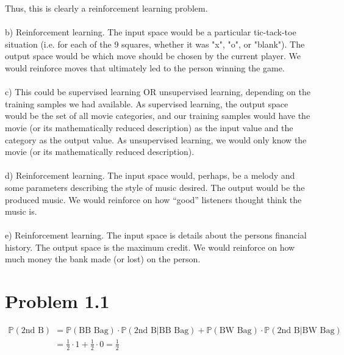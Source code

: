 \documentclass[11pt,letterpaper]{article}
\newcommand{\p}[0]{\mathbb{P}}
\begin{document}
Thus, this is clearly a reinforcement learning problem.
\\\\
b) Reinforcement learning.  The input space would be a particular tic-tack-toe situation (i.e. for each of the 9 squares, whether it was "x", "o", or "blank").  The output space would be which move should be chosen by the current player.  We would reinforce moves that ultimately led to the person winning the game.
\\\\
c) This could be supervised learning OR unsupervised learning, depending on the training samples we had available.  As supervised learning, the output space would be the set of all movie categories, and our training samples would have the movie (or its mathematically reduced description) as the input value and the category as the output value.  As unsupervised learning, we would only know the movie (or its mathematically reduced description).
\\\\
d) Reinforcement learning.  The input space would, perhaps, be a melody and some parameters describing the style of music desired.  The output would be the produced music.  We would reinforce on how ``good'' listeners thought think the music is.
\\\\
e) Reinforcement learning.  The input space is details about the persons financial history.  The output space is the maximum credit.  We would reinforce on how much money the bank made (or lost) on the person.

\section*{Problem 1.1}
\begin{align*}
    \p(\textrm{2nd B}) &=
    \p(\textrm{BB Bag}) \cdot \p(\textrm{2nd B}|\textrm{BB Bag}) + \p(\textrm{BW Bag}) \cdot \p(\textrm{2nd B}|\textrm{BW Bag}) \\
    &= \frac{1}{2}\cdot 1 + \frac{1}{2} \cdot 0 = \frac{1}{2}
\end{align*}
\end{document}
